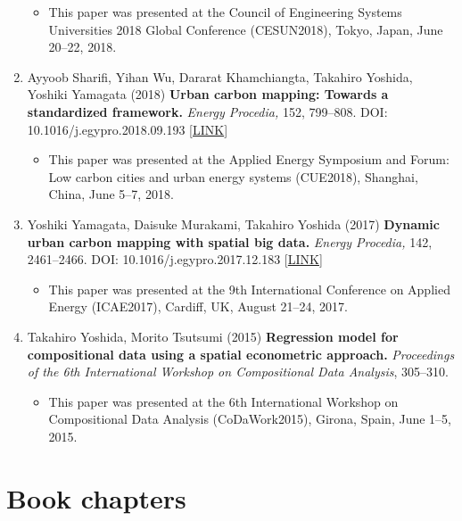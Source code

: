 \documentclass[
]{book}
\providecommand{\tightlist}{%
  \setlength{\itemsep}{0pt}\setlength{\parskip}{0pt}}
\begin{document}
\begin{enumerate}
  \begin{itemize}
  \tightlist
  \item
    This paper was presented at the Council of Engineering Systems Universities 2018 Global Conference (CESUN2018), Tokyo, Japan, June 20--22, 2018.
  \end{itemize}
\item
  Ayyoob Sharifi, Yihan Wu, Dararat Khamchiangta, Takahiro Yoshida, Yoshiki Yamagata (2018)
  \textbf{Urban carbon mapping: Towards a standardized framework.}
  \emph{Energy Procedia,} 152, 799--808.
  DOI: 10.1016/j.egypro.2018.09.193 {[}\href{https://www.sciencedirect.com/science/article/pii/S1876610218307379}{LINK}{]}

  \begin{itemize}
  \tightlist
  \item
    This paper was presented at the Applied Energy Symposium and Forum: Low carbon cities and urban energy systems (CUE2018), Shanghai, China, June 5--7, 2018.
  \end{itemize}
\item
  Yoshiki Yamagata, Daisuke Murakami, Takahiro Yoshida (2017)
  \textbf{Dynamic urban carbon mapping with spatial big data.}
  \emph{Energy Procedia,} 142, 2461--2466.
  DOI: 10.1016/j.egypro.2017.12.183 {[}\href{https://www.sciencedirect.com/science/article/pii/S1876610217359131}{LINK}{]}

  \begin{itemize}
  \tightlist
  \item
    This paper was presented at the 9th International Conference on Applied Energy (ICAE2017), Cardiff, UK, August 21--24, 2017.
  \end{itemize}
\item
  Takahiro Yoshida, Morito Tsutsumi (2015)
  \textbf{Regression model for compositional data using a spatial econometric approach.}
  \emph{Proceedings of the 6th International Workshop on Compositional Data Analysis}, 305--310.

  \begin{itemize}
  \tightlist
  \item
    This paper was presented at the 6th International Workshop on Compositional Data Analysis (CoDaWork2015), Girona, Spain, June 1--5, 2015.
  \end{itemize}
\end{enumerate}

\section*{Book chapters}\label{book-chapters}
\end{document}
